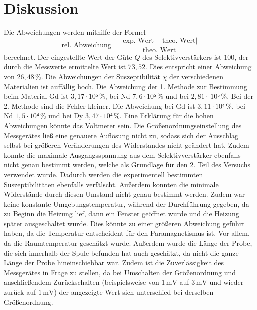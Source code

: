%

\section{Diskussion}
\label{sec:Diskussion}
Die Abweichungen werden mithilfe der Formel
\begin{equation*}
    \text{rel. Abweichung} = \frac{|\text{exp. Wert} - \text{theo. Wert}|}{\text{theo. Wert}}
  \end{equation*}
berechnet. Der eingestellte Wert der Güte $Q$ des Selektivverstärkers ist $100$, der durch die Messwerte ermittelte Wert ist $73,52$. Dies entspricht einer Abweichung
von $26,48 \,\%$.
Die Abweichungen der Suszeptibilität $\chi$ der verschiedenen Materialien ist auffällig hoch. Die Abweichung der 1. Methode zur Bestimmung beim Material Gd ist 
$3,17 \cdot 10⁵ \, \%$, bei Nd $7,6 \cdot 10⁵ \, \%$ und bei $2,81 \cdot \ 10⁵ \, \%$. Bei der 2. Methode sind die Fehler kleiner. Die Abweichung bei
Gd ist $3,11 \cdot 10⁴ \, \%$, bei Nd $1,5 \cdot 10⁴ \, \%$ und bei Dy $3,47 \cdot 10⁴ \, \%$.
Eine Erklärung für die hohen Abweichungen könnte das Voltmeter sein. Die Größenordnungseinstellung des Messgerätes ließ eine genauere Auflösung nicht zu, sodass sich
der Ausschlag selbst bei größeren Veränderungen des Widerstandes nicht geändert hat. Zudem konnte die maximale Ausgangsspannung aus dem Selektivverstärker 
ebenfalls nicht genau bestimmt werden, welche als Grundlage für den 2. Teil des Versuchs verwendet wurde. Dadurch werden die experimentell bestimmten Suszeptibilitäten 
ebenfalls verfälscht. 
Außerdem konnten die minimale Widerstände durch diesen Umstand nicht genau bestimmt werden. Zudem war keine konstante Umgebungstemperatur, während der Durchführung 
gegeben, da zu Beginn die Heizung lief, dann ein Fenster geöffnet wurde und die Heizung später ausgeschaltet wurde. Dies könnte zu einer größeren Abweichung geführt 
haben, da die Temperatur entscheident für den Paramagnetismus ist. Vor allem, da die Raumtemperatur geschätzt wurde.
Außerdem wurde die Länge der Probe, die sich innerhalb der Spule befunden hat auch geschätzt, da nicht die ganze Länge der Probe hineinschiebbar war. Zudem ist die 
Zuverlässigkeit des Messgerätes in Frage zu stellen, da bei Umschalten der Größenordnung und anschließendem Zurückschalten (beispielsweise von 
$1 \, \unit{\milli\volt}$ auf $3 \, \unit{\milli\volt}$ und wieder zurück auf $1 \, \unit{\milli\volt}$) der angezeigte Wert sich 
unterschied bei derselben Größenordnung. 
